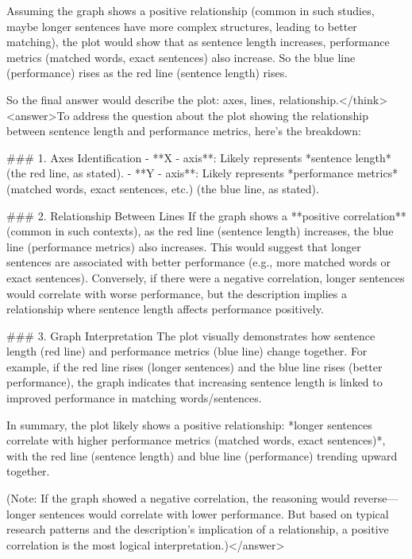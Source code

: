 Assuming the graph shows a positive relationship (common in such studies, maybe longer sentences have more complex structures, leading to better matching), the plot would show that as sentence length increases, performance metrics (matched words, exact sentences) also increase. So the blue line (performance) rises as the red line (sentence length) rises.

So the final answer would describe the plot: axes, lines, relationship.</think><answer>To address the question about the plot showing the relationship between sentence length and performance metrics, here’s the breakdown:  

### 1. Axes Identification  
- **X - axis**: Likely represents *sentence length* (the red line, as stated).  
- **Y - axis**: Likely represents *performance metrics* (matched words, exact sentences, etc.) (the blue line, as stated).    

### 2. Relationship Between Lines  
If the graph shows a **positive correlation** (common in such contexts), as the red line (sentence length) increases, the blue line (performance metrics) also increases. This would suggest that longer sentences are associated with better performance (e.g., more matched words or exact sentences). Conversely, if there were a negative correlation, longer sentences would correlate with worse performance, but the description implies a relationship where sentence length affects performance positively.    

### 3. Graph Interpretation  
The plot visually demonstrates how sentence length (red line) and performance metrics (blue line) change together. For example, if the red line rises (longer sentences) and the blue line rises (better performance), the graph indicates that increasing sentence length is linked to improved performance in matching words/sentences.    

In summary, the plot likely shows a positive relationship: *longer sentences correlate with higher performance metrics (matched words, exact sentences)*, with the red line (sentence length) and blue line (performance) trending upward together.  


(Note: If the graph showed a negative correlation, the reasoning would reverse—longer sentences would correlate with lower performance. But based on typical research patterns and the description’s implication of a relationship, a positive correlation is the most logical interpretation.)</answer>